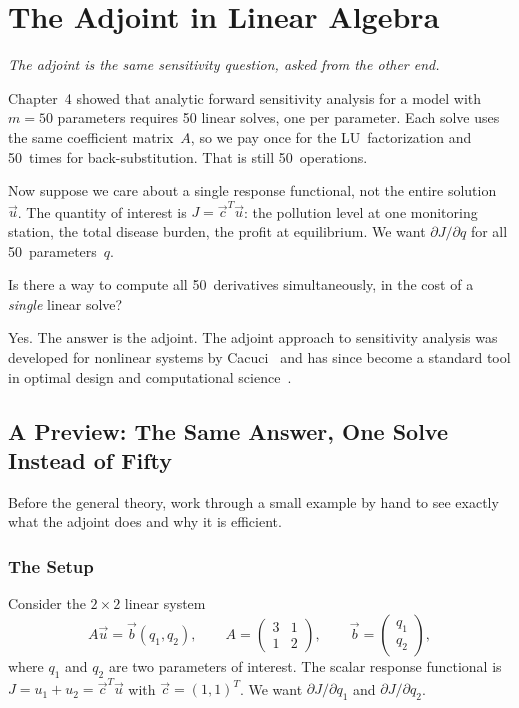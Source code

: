 \chapter{The Adjoint in Linear Algebra}

\begin{flushright}
\textit{The adjoint is the same sensitivity question, asked from the other end.}
\end{flushright}

\bigskip

Chapter~4 showed that analytic forward sensitivity analysis for a
model with $m = 50$ parameters requires 50 linear solves, one per
parameter. Each solve uses the same coefficient matrix~$A$, so we
pay once for the LU~factorization and 50~times for back-substitution.
That is still 50~operations.

Now suppose we care about a single response functional, not the
entire solution~$\vec{u}$. The quantity of interest is
$J = \vec{c}^T\vec{u}$: the pollution level at one monitoring station,
the total disease burden, the profit at equilibrium.
We want $\partial J/\partial q$ for all 50~parameters~$q$.

Is there a way to compute all 50~derivatives simultaneously,
in the cost of a \emph{single} linear solve?

Yes. The answer is the adjoint.
The adjoint approach to sensitivity analysis was developed for nonlinear
systems by Cacuci~\cite{cacuci1981sensitivity} and has since become a
standard tool in optimal design and computational science~\cite{giles2000introduction}.

\section{A Preview: The Same Answer, One Solve Instead of Fifty}
\label{sec:adjoint_preview}

Before the general theory, work through a small example by hand
to see exactly what the adjoint does and why it is efficient.

\subsection*{The Setup}

Consider the $2 \times 2$ linear system
\begin{equation}
  A\vec{u} = \vec{b}(q_1, q_2),
  \qquad
  A = \begin{pmatrix} 3 & 1 \\ 1 & 2 \end{pmatrix},
  \qquad
  \vec{b} = \begin{pmatrix} q_1 \\ q_2 \end{pmatrix},
  \label{eq:preview_system}
\end{equation}
where $q_1$ and $q_2$ are two parameters of interest.
The scalar response functional is
$J = u_1 + u_2 = \vec{c}^T\vec{u}$ with $\vec{c} = (1,1)^T$.
We want $\partial J/\partial q_1$ and $\partial J/\partial q_2$.

